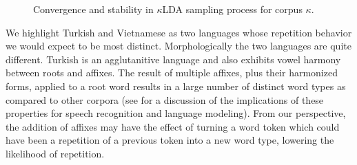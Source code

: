 \begin{figure}
\begin{center}
\hfill
{}
\end{center}                    
\caption[Convergence and stability of corpus $\kappa$]{Convergence and stability in $\kappa$LDA sampling process for corpus $\kappa$. \label{fig6:kldaKappaIt}}
\end{figure}

We highlight Turkish and Vietnamese as two languages whose repetition behavior we would expect to be most distinct.  Morphologically the two languages are quite different.  Turkish is an agglutanitive language and also exhibits vowel harmony between roots and affixes.  The result of multiple affixes, plus their harmonized forms, applied to a root word results in a large number of distinct word types as compared to other corpora (see \cite{mengusoglu2001} for a discussion of the implications of these properties for speech recognition and language modeling). From our perspective, the addition of affixes may have the effect of turning a word token which could have been a repetition of a previous token into a new word type, lowering the likelihood of repetition.

